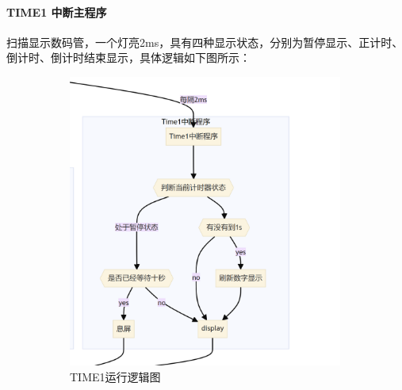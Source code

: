 \documentclass{article}
\begin{document}
\paragraph*{TIME1 中断主程序}
扫描显示数码管，一个灯亮2ms，具有四种显示状态，分别为暂停显示、正计时、倒计时、倒计时结束显示，具体逻辑如下图所示：
\begin{figure}[H]
    \begin{subfigure}{0.3\textwidth}
        \centering
        \includegraphics[width=0.99\textwidth]{assets/image-20240501210725402.png}
        \caption{TIME1运行逻辑图}
    \end{subfigure}
    \begin{subfigure}{0.69\textwidth}
        \centering

\end{subfigure}
\end{figure}
\end{document}

